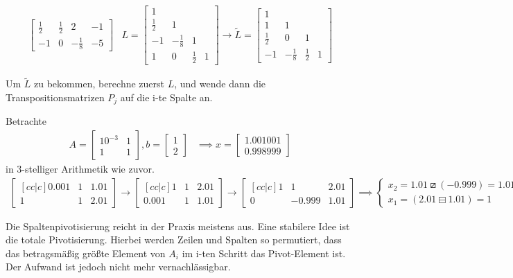 \begin{example}
\begin{align*}
\begin{bmatrix}
	\frac{1}{2} & \frac{1}{2} & 2 & -1 \\
	-1 & 0 & -\frac{1}{8} & -5
\end{bmatrix} & L= \begin{bmatrix}
1 \\
\frac{1}{2} & 1 \\
-1 & -\frac{1}{8} &1 \\
1 & 0& \frac{1}{2}& 1
\end{bmatrix} \to \tilde{L} = \begin{bmatrix}
1 \\
1 & 1 \\
\frac{1}{2} & 0 & 1 \\
-1 & -\frac{1}{8} & \frac{1}{2} &1
\end{bmatrix}
\end{align*}
\end{example}
\begin{remark}
Um $\tilde{L}$ zu bekommen, berechne zuerst $L$, und wende dann die Transpositionsmatrizen $P_j$  auf die i-te Spalte an.
\end{remark}
\begin{example}
Betrachte
\begin{align*}
A= \begin{bmatrix}
	10^{-3} & 1 \\ 1 & 1
\end{bmatrix},
b= \begin{bmatrix}
1 \\ 2 
\end{bmatrix} &\implies x= \begin{bmatrix}
1.001001 \\ 0.998999
\end{bmatrix}
\end{align*}
in 3-stelliger Arithmetik wie zuvor.
\begin{align*}
\begin{bmatrix}[c c | c]
	0.001 & 1 & 1.01 \\
	1 & 1 & 2.01
\end{bmatrix} \to \begin{bmatrix}[c c | c]
	1 & 1 & 2.01 \\
	0.001 & 1 & 1.01 
\end{bmatrix} \to \begin{bmatrix}[c c | c]
	1 & 1 &2.01 \\
	0 & -0.999 & 1.01
\end{bmatrix} \implies \begin{cases}
	x_2= 1.01 \boxslash (-0.999) = 1.01 \\
	x_1= (2.01 \boxminus 1.01) =1
\end{cases}
\end{align*}
\end{example}
\begin{remark}
Die Spaltenpivotisierung reicht in der Praxis meistens aus. Eine stabilere Idee ist die totale Pivotisierung. Hierbei werden Zeilen und Spalten so permutiert, dass das betragsmäßig größte Element von $A_i$ im i-ten Schritt das Pivot-Element ist. Der Aufwand ist jedoch nicht mehr vernachlässigbar. 
\end{remark}

